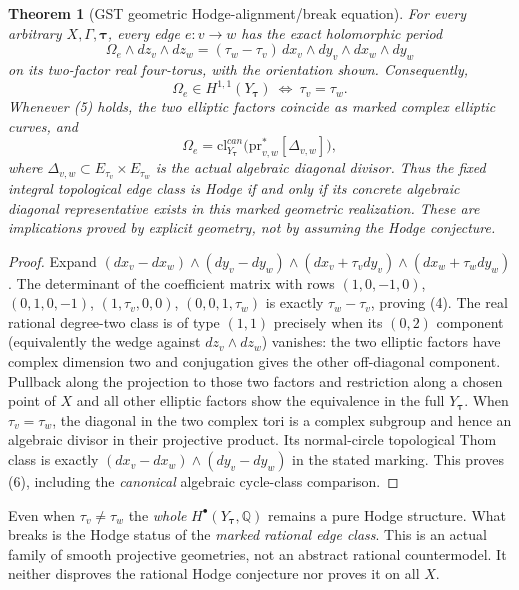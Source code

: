 \documentclass[11pt]{article}
\newtheorem{theorem}{Theorem}
\begin{document}
\begin{theorem}[GST geometric Hodge-alignment/break equation]
For every arbitrary $X,\Gamma,\boldsymbol\tau$, every edge
$e:v\to w$ has the \emph{exact} holomorphic period
\[
 \boxed{
 \Omega_e\wedge dz_v\wedge dz_w
   =(\tau_w-\tau_v)\,
     dx_v\wedge dy_v\wedge dx_w\wedge dy_w
 }                                                            \tag{4}
\]
on its two-factor real four-torus, with the orientation
shown. Consequently,
\[
 \boxed{
 \Omega_e\in H^{1,1}(Y_{\boldsymbol\tau})
 \ \Longleftrightarrow\ \tau_v=\tau_w.
 }                                                            \tag{5}
\]
Whenever (5) holds, the two elliptic factors coincide
as marked complex elliptic curves, and
\[
 \boxed{
 \Omega_e=\mathrm{cl}^{can}_{Y_{\boldsymbol\tau}}
 \bigl(\mathrm{pr}_{v,w}^*[\Delta_{v,w}]\bigr),
 }                                                            \tag{6}
\]
where $\Delta_{v,w}\subset E_{\tau_v}\times E_{\tau_w}$
is the \emph{actual algebraic diagonal divisor}.
Thus the fixed integral topological edge class is
Hodge if and only if its concrete algebraic diagonal
representative exists in this marked geometric realization.
These are implications proved by explicit geometry,
not by assuming the Hodge conjecture.
\end{theorem}
\begin{proof}
Expand
$(dx_v-dx_w)\wedge(dy_v-dy_w)\wedge
 (dx_v+\tau_vdy_v)\wedge(dx_w+\tau_wdy_w)$.
The determinant of the coefficient matrix with rows
$(1,0,-1,0)$, $(0,1,0,-1)$,
$(1,\tau_v,0,0)$, $(0,0,1,\tau_w)$
is exactly $\tau_w-\tau_v$, proving (4).
The real rational degree-two class is of type $(1,1)$
precisely when its $(0,2)$ component (equivalently
the wedge against $dz_v\wedge dz_w$) vanishes:
the two elliptic factors have complex dimension two
and conjugation gives the other off-diagonal component.
Pullback along the projection to those two factors
and restriction along a chosen point of $X$ and all
other elliptic factors show the equivalence in the
full $Y_{\boldsymbol\tau}$.
When $\tau_v=\tau_w$, the diagonal in the two
complex tori is a complex subgroup and hence
an algebraic divisor in their projective product.
Its normal-circle topological Thom class is
exactly $(dx_v-dx_w)\wedge(dy_v-dy_w)$ in the
stated marking. This proves (6), including
the \emph{canonical} algebraic cycle-class comparison.
\end{proof}
\begin{remark}
Even when $\tau_v\ne\tau_w$ the \emph{whole}
$H^\bullet(Y_{\boldsymbol\tau},\mathbb Q)$ remains
a pure Hodge structure. What breaks is the Hodge
status of the \emph{marked rational edge class}.
This is an actual family of smooth projective
geometries, not an abstract rational countermodel.
It neither disproves the rational Hodge conjecture
nor proves it on all $X$.
\end{remark}
\end{document}
